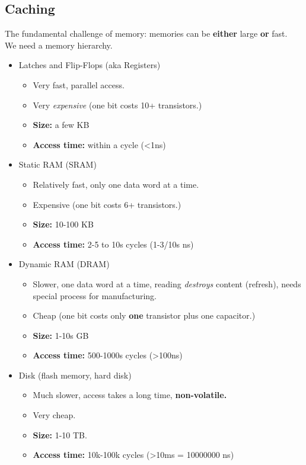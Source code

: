 \documentclass[10pt]{article}
\begin{document}
\subsection*{Caching}
The fundamental challenge of memory: memories can be \textbf{either} large \textbf{or} fast.\\
We need a memory hierarchy.
\begin{itemize}
    \item Latches and Flip-Flops (aka Registers)
    \begin{itemize}
        \item Very fast, parallel access.
        \item Very \textit{expensive} (one bit costs 10+ transistors.)
        \item \textbf{Size:} a few KB
        \item \textbf{Access time:} within a cycle (<1ns)
    \end{itemize}
    \item Static RAM (SRAM)
    \begin{itemize}
        \item Relatively fast, only one data word at a time.
        \item Expensive (one bit costs 6+ transistors.)
        \item \textbf{Size:} 10-100 KB
        \item \textbf{Access time:} 2-5 to 10s cycles (1-3/10s ns)
    \end{itemize}
    \item Dynamic RAM (DRAM)
    \begin{itemize}
        \item Slower, one data word at a time, reading \textit{destroys} content (refresh), needs special process for manufacturing.
        \item Cheap (one bit costs only \textbf{one} transistor plus one capacitor.)
        \item \textbf{Size:} 1-10s GB
        \item \textbf{Access time:} 500-1000s cycles (>100ns)
    \end{itemize}
    \item Disk (flash memory, hard disk)
    \begin{itemize}
        \item Much slower, access takes a long time, \textbf{non-volatile.}
        \item Very cheap.
        \item \textbf{Size:} 1-10 TB.
        \item \textbf{Access time:} 10k-100k cycles (>10ms = 10000000 ns)
    \end{itemize}
\end{itemize}
\end{document}
